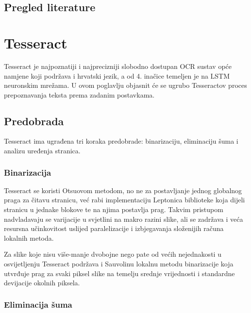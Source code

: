 \documentclass[zavrsnirad]{fer}
\begin{document}
\section{Pregled literature}

\cite{Berg2013}
\cite{Springmann2014}
\cite{Christy2017}
\cite{Wick2018}
\cite{Garrette2015}
\cite{Garrette2016}


\chapter{Tesseract}
\label{pog:tesseract}

Tesseract \cite{Smith2007} je najpoznatiji i najprecizniji slobodno dostupan OCR sustav opće namjene koji podržava i hrvatski jezik, a od 4. inačice temeljen je na LSTM neuronskim mrežama. U ovom poglavlju objasnit će se ugrubo Tesseractov proces prepoznavanja teksta prema zadanim postavkama.

\section{Predobrada}

Tesseract ima ugrađena tri koraka predobrade: binarizaciju, eliminaciju šuma i analizu uređenja stranica.

\subsection{Binarizacija}

Tesseract se koristi Otsuovom metodom, no ne za postavljanje jednog globalnog praga za čitavu stranicu, već rabi implementaciju Leptonica biblioteke \cite{Leptonica} koja dijeli stranicu u jednake blokove te na njima postavlja prag. Takvim pristupom nadvladavaju se varijacije u svjetlini na makro razini slike, ali se zadržava i veća resursna učinkovitost uslijed paralelizacije i izbjegavanja složenijih računa lokalnih metoda.

Za slike koje nisu više-manje dvobojne nego pate od većih nejednakosti u osvijetljenju Tesseract podržava i Sauvolinu \cite{Sauvola1997} lokalnu metodu binarizacije koja utvrđuje prag za svaki piksel slike na temelju srednje vrijednosti i standardne devijacije okolnih piksela.

\subsection{Eliminacija šuma}
\end{document}
